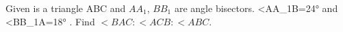 Given is a triangle ABC and $ AA_1 $,  $ BB_1 $ are angle bisectors.  <AA_1B=24° and <BB_1A=18° . Find $ <BAC:<ACB:<ABC $.